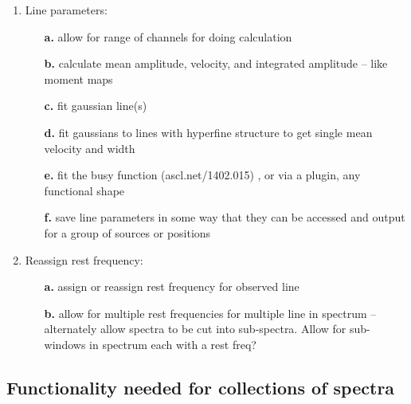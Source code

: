 \documentclass[12pt,a4paper]{article}
\begin{document}
\begin{enumerate}
\item Line parameters:
  \begin{itemize}
  \item[{\bf a.}]
   allow for range of channels for doing calculation
  \item[{\bf b.}]
   calculate mean amplitude, velocity, and integrated
        amplitude -- like moment maps
  \item[{\bf c.}]
   fit gaussian line(s)
  \item[{\bf d.}]
   fit gaussians to lines with hyperfine structure to get
           single mean velocity and width
  \item[{\bf e.}]
   fit the busy function (ascl.net/1402.015) , or via a plugin, any functional shape
  \item[{\bf f.}]
   save line parameters in some way that they can be
           accessed and output for a group of sources or
	   positions
  \end{itemize}

\item Reassign rest frequency:
  \begin{itemize}
  \item[{\bf a.}]   
   assign or reassign rest frequency for observed line
  \item[{\bf b.}]   
   allow for multiple rest frequencies for multiple line
             in spectrum -- alternately allow spectra to
	     be cut into sub-spectra. Allow for sub-windows
	     in spectrum each with a rest freq?
  \end{itemize}

  
\end{enumerate}


\subsection{Functionality needed for collections of spectra}
\end{document}
